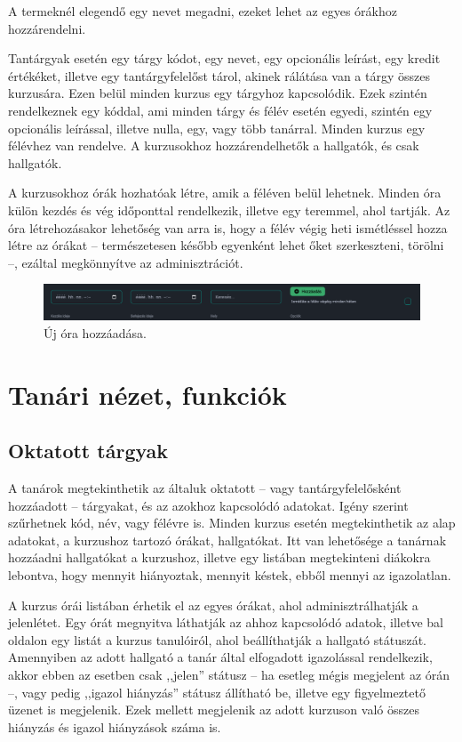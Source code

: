 \documentclass[
]{thesis-ekf}
\theoremstyle{definition}
\theoremstyle{remark}
\begin{document}
A termeknél elegendő egy nevet megadni, ezeket lehet az egyes órákhoz hozzárendelni.

Tantárgyak esetén egy tárgy kódot, egy nevet, egy opcionális leírást, egy kredit értékéket, illetve egy tantárgyfelelőst tárol, akinek rálátása van a tárgy összes kurzusára. Ezen belül minden kurzus egy tárgyhoz kapcsolódik. Ezek szintén rendelkeznek egy kóddal, ami minden tárgy és félév esetén egyedi, szintén egy opcionális leírással, illetve nulla, egy, vagy több tanárral. Minden kurzus egy félévhez van rendelve. A kurzusokhoz hozzárendelhetők a hallgatók, és csak hallgatók.

A kurzusokhoz órák hozhatóak létre, amik a féléven belül lehetnek. Minden óra külön kezdés és vég időponttal rendelkezik, illetve egy teremmel, ahol tartják. Az óra létrehozásakor lehetőség van arra is, hogy a félév végig heti ismétléssel hozza létre az órákat -- természetesen később egyenként lehet őket szerkeszteni, törölni --, ezáltal megkönnyítve az adminisztrációt.

\begin{figure}[ht!]
	\centering
	\includegraphics[width=15cm]{../pictures/screenshots/newclass.png}
	\caption{Új óra hozzáadása.}
	\label{newclass}
\end{figure}


\section{Tanári nézet, funkciók}

\subsection{Oktatott tárgyak}

A tanárok megtekinthetik az általuk oktatott -- vagy tantárgyfelelősként hozzáadott -- tárgyakat, és az azokhoz kapcsolódó adatokat. Igény szerint szűrhetnek kód, név, vagy félévre is. Minden kurzus esetén megtekinthetik az alap adatokat, a kurzushoz tartozó órákat, hallgatókat. Itt van lehetősége a tanárnak hozzáadni hallgatókat a kurzushoz, illetve egy listában megtekinteni diákokra lebontva, hogy mennyit hiányoztak, mennyit késtek, ebből mennyi az igazolatlan.

A kurzus órái listában érhetik el az egyes órákat, ahol adminisztrálhatják a jelenlétet. Egy órát megnyitva láthatják az ahhoz kapcsolódó adatok, illetve bal oldalon egy listát a kurzus tanulóiról, ahol beállíthatják a hallgató státuszát. Amennyiben az adott hallgató a tanár által elfogadott igazolással rendelkezik, akkor ebben az esetben csak ,,jelen'' státusz -- ha esetleg mégis megjelent az órán --, vagy pedig ,,igazol hiányzás'' státusz állítható be, illetve egy figyelmeztető üzenet is megjelenik. Ezek mellett megjelenik az adott kurzuson való összes hiányzás és igazol hiányzások száma is.
\end{document}
